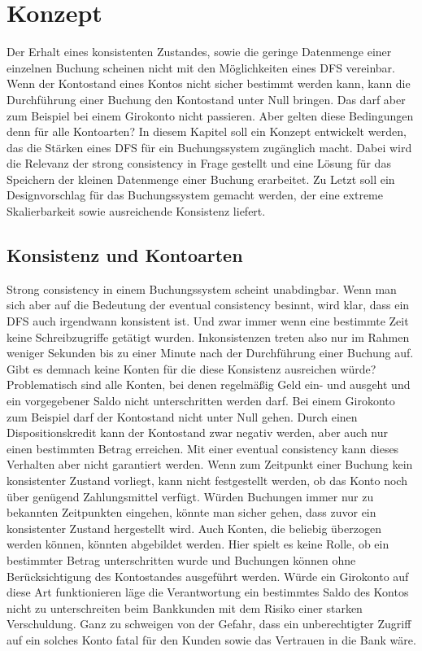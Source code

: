 \documentclass[12pt,oneside,a4paper,parskip]{scrbook}
\begin{document}
\chapter{Konzept}
\label{concept}
Der Erhalt eines konsistenten Zustandes, sowie die geringe Datenmenge einer einzelnen Buchung scheinen nicht mit den Möglichkeiten eines DFS vereinbar. Wenn der Kontostand eines Kontos nicht sicher bestimmt werden kann, kann die Durchführung einer Buchung den Kontostand unter Null bringen. Das darf aber zum Beispiel bei einem Girokonto nicht passieren. Aber gelten diese Bedingungen denn für alle Kontoarten? In diesem Kapitel soll ein Konzept entwickelt werden, das die Stärken eines DFS für ein Buchungssystem zugänglich macht. Dabei wird die Relevanz der strong consistency in Frage gestellt und eine Lösung für das Speichern der kleinen Datenmenge einer Buchung erarbeitet. Zu Letzt soll ein Designvorschlag für das Buchungssystem gemacht werden, der eine extreme Skalierbarkeit sowie ausreichende Konsistenz liefert.

\section{Konsistenz und Kontoarten}
\label{konsistenzKonten}
Strong consistency in einem Buchungssystem scheint unabdingbar. Wenn man sich aber auf die Bedeutung der eventual consistency besinnt, wird klar, dass ein DFS auch irgendwann konsistent ist. Und zwar immer wenn eine bestimmte Zeit keine Schreibzugriffe getätigt wurden. 
Inkonsistenzen treten also nur im Rahmen weniger Sekunden bis zu einer Minute nach der Durchführung einer Buchung auf. Gibt es demnach keine Konten für die diese Konsistenz ausreichen würde? Problematisch sind alle Konten, bei denen regelmäßig Geld ein- und ausgeht und ein vorgegebener Saldo nicht unterschritten werden darf. Bei einem Girokonto zum Beispiel darf der Kontostand nicht unter Null gehen. Durch einen Dispositionskredit kann der Kontostand zwar negativ werden, aber auch nur einen bestimmten Betrag erreichen. Mit einer eventual consistency kann dieses Verhalten aber nicht garantiert werden. Wenn zum Zeitpunkt einer Buchung kein konsistenter Zustand vorliegt, kann nicht festgestellt werden, ob das Konto noch über genügend Zahlungsmittel verfügt. Würden Buchungen immer nur zu bekannten Zeitpunkten eingehen, könnte man sicher gehen, dass zuvor ein konsistenter Zustand hergestellt wird. Auch Konten, die beliebig überzogen werden können, könnten abgebildet werden. Hier spielt es keine Rolle, ob ein bestimmter Betrag unterschritten wurde und Buchungen können ohne Berücksichtigung des Kontostandes ausgeführt werden. Würde ein Girokonto auf diese Art funktionieren läge die Verantwortung ein bestimmtes Saldo des Kontos nicht zu unterschreiten beim Bankkunden mit dem Risiko einer starken Verschuldung. Ganz zu schweigen von der Gefahr, dass ein unberechtigter Zugriff auf ein solches Konto fatal für den Kunden sowie das Vertrauen in die Bank wäre.
\end{document}
